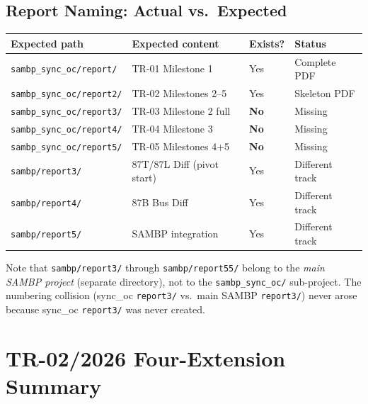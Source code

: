 \documentclass[12pt,a4paper]{article}
\begin{document}
\subsection{Report Naming: Actual vs.\ Expected}

\begin{center}
\begin{tabular}{llll}
\toprule
\textbf{Expected path} & \textbf{Expected content} & \textbf{Exists?} & \textbf{Status} \\
\midrule
\texttt{sambp\_sync\_oc/report/}  & TR-01 Milestone 1       & Yes & Complete PDF \\
\texttt{sambp\_sync\_oc/report2/} & TR-02 Milestones 2--5   & Yes & Skeleton PDF \\
\texttt{sambp\_sync\_oc/report3/} & TR-03 Milestone 2 full  & \textbf{No} & Missing \\
\texttt{sambp\_sync\_oc/report4/} & TR-04 Milestone 3       & \textbf{No} & Missing \\
\texttt{sambp\_sync\_oc/report5/} & TR-05 Milestones 4+5    & \textbf{No} & Missing \\
\midrule
\texttt{sambp/report3/}  & 87T/87L Diff (pivot start) & Yes & Different track \\
\texttt{sambp/report4/}  & 87B Bus Diff               & Yes & Different track \\
\texttt{sambp/report5/}  & SAMBP integration          & Yes & Different track \\
\bottomrule
\end{tabular}
\end{center}

\noindent Note that \texttt{sambp/report3/} through \texttt{sambp/report55/}
belong to the \emph{main SAMBP project} (separate directory), not to the
\texttt{sambp\_sync\_oc/} sub-project.  The numbering collision
(sync\_oc \texttt{report3/} vs.\ main SAMBP \texttt{report3/}) never arose
because sync\_oc \texttt{report3/} was never created.

\section{TR-02/2026 Four-Extension Summary}
\label{app:extensions}
\end{document}
